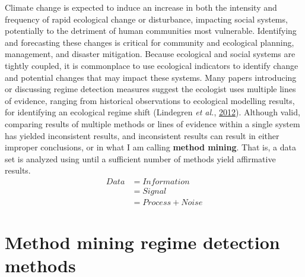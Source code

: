 \documentclass[12pt,twoside,openany]{reedthesis}
\begin{document}
Climate change is expected to induce an increase in both the intensity and frequency of rapid ecological change or disturbance, impacting social systems, potentially to the detriment of human communities most vulnerable. Identifying and forecasting these changes is critical for community and ecological planning, management, and disaster mitigation. Because ecological and social systems are tightly coupled, it is commonplace to use ecological indicators to identify change and potential changes that may impact these systems. Many papers introducing or discussing regime detection measures suggest the ecologist uses multiple lines of evidence, ranging from historical observations to ecological modelling results, for identifying an ecological regime shift (Lindegren \emph{et al.}, \protect\hyperlink{ref-lindegren_early_2012}{2012}). Although valid, comparing results of multiple methods or lines of evidence within a single system has yielded inconsistent results, and inconsistent results can result in either improper conclusions, or in what I am calling \textbf{method mining}. That is, a data set is analyzed using until a sufficient number of methods yield affirmative results.
\begin{equation}
\begin{split}
Data  & = Information \\
& = Signal \\
& = Process + Noise
\end{split}
\label{eq:infoTheory}
\end{equation}
\hypertarget{method-mining-regime-detection-methods}{%
\section{Method mining regime detection methods}\label{method-mining-regime-detection-methods}}
\end{document}
